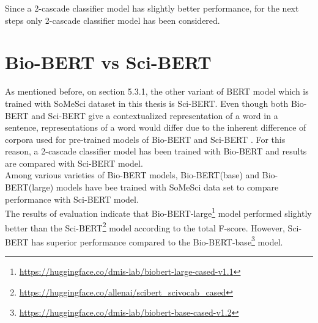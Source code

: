 Since a 2-cascade classifier model has slightly better performance, for the next steps only 2-cascade classifier model has been considered. \\

\section{Bio-BERT vs Sci-BERT}
\label{sec:chapter06:biosci}

As mentioned before, on section 5.3.1, the other variant of BERT model which is trained with SoMeSci dataset in this thesis is Sci-BERT. Even though both \ac{Bio-BERT} and \ac{Sci-BERT} give a contextualized representation of a word in a sentence, representations of a word would differ due to the inherent difference of corpora used for pre-trained models of Bio-BERT and Sci-BERT \citep{beltagy2019scibert,li2019fine}. For this reason, a 2-cascade classifier model has been trained with Bio-BERT and results are compared with Sci-BERT model. \\

Among various varieties of Bio-BERT models, Bio-BERT(base) and Bio-BERT(large) models have bee trained with SoMeSci data set to compare performance with Sci-BERT model. \\

The results of evaluation indicate that  Bio-BERT-large\footnote{\url{https://huggingface.co/dmis-lab/biobert-large-cased-v1.1}} model performed slightly better than the Sci-BERT\footnote{\url{https://huggingface.co/allenai/scibert_scivocab_cased}} model according to the total F-score. However, Sci-BERT has superior performance compared to the Bio-BERT-base\footnote{\url{https://huggingface.co/dmis-lab/biobert-base-cased-v1.2}} model. \\


